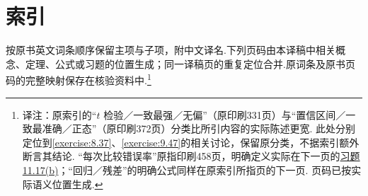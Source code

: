\clearpage\section*{索引}\label{app:index}
按原书英文词条顺序保留主项与子项，附中文译名.下列页码由本译稿中相关概念、定理、公式或习题的位置生成；同一译稿页的重复定位合并.原词条及原书页码的完整映射保存在核验资料中.\footnote{译注：原索引的“$t$ 检验／一致最强／无偏”（原印刷331页）与“置信区间／一致最准确／正态”（原印刷372页）分类比所引内容的实际陈述更宽. 此处分别定位到\autoref{exercise:8.37}、\autoref{exercise:9.47}的相关讨论，保留原分类，不据索引额外断言其结论. “每次比较错误率”原指印刷458页，明确定义实际在下一页的\hyperref[item:11.17.b]{习题11.17(b)}；“回归／残差”的明确公式同样在原索引所指页的下一页. 页码已按实际语义位置生成.}
\begingroup\small\raggedright{}\setlength{\parskip}{0pt}\setlength{\columnsep}{1.5em}
